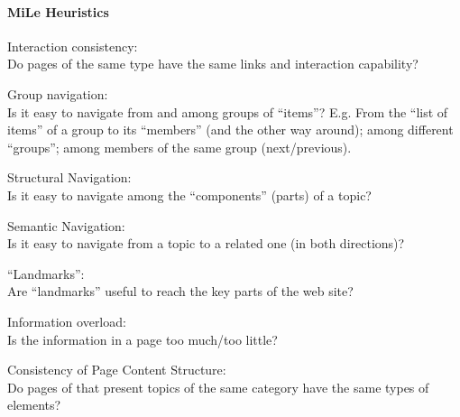 \documentclass[11pt, letterpaper]{article}
\begin{document}
\paragraph{MiLe Heuristics}
\begin{MN}
    \item Interaction consistency: \\
            Do pages of the same type have the same links and interaction capability? 
    \item Group navigation: \\
            Is it easy to navigate from and among groups of “items”? E.g. From the “list of items” of a group to its “members” (and the other way around); among different “groups”; among members of the same group (next/previous). 
    \item Structural Navigation: \\
            Is it easy to navigate among the “components” (parts) of a topic?
    \item Semantic Navigation:  \\ 
            Is it easy to navigate from a topic to a related one (in both directions)? 
    \item “Landmarks”: \\
            Are “landmarks” useful to reach the key parts of the web site?
\end{MN}
\vspace{1cm}
\begin{MC}
    \item Information overload: \\
            Is the information in a page too much/too little? 
    \item Consistency of Page Content Structure:  \\
            Do pages of that present topics of the same category have the same types of elements?
\end{MC}
\vspace{1cm}
\end{document}
